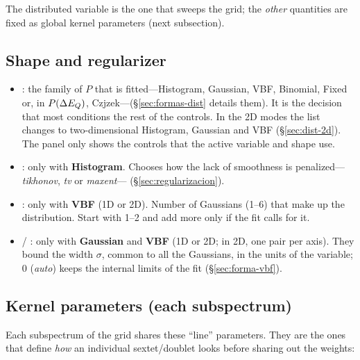 The distributed variable is the one that sweeps the grid; the \emph{other}
quantities are fixed as global kernel parameters (next subsection).

\subsection{Shape and regularizer}

\begin{itemize}[nosep]
  \item {}: the family of $P$ that is fitted---Histogram, Gaussian, VBF,
        Binomial, Fixed or, in $P(\Delta E_{Q})$, Czjzek---(\S\ref{sec:formas-dist} details them). It is the
        decision that most conditions the rest of the controls. In the 2D modes
        the list changes to two-dimensional Histogram, Gaussian and VBF
        (\S\ref{sec:dist-2d}). The panel only shows the controls that the
        active variable and shape use.
  \item {}: only with \textbf{Histogram}. Chooses how the lack of
        smoothness is penalized---\emph{tikhonov}, \emph{tv} or \emph{maxent}---
        (\S\ref{sec:regularizacion}).
  \item {}: only with \textbf{VBF} (1D or 2D). Number of Gaussians (1--6)
        that make up the distribution. Start with 1--2 and add more only if the fit
        calls for it.
  \item {} / : only with \textbf{Gaussian} and
        \textbf{VBF} (1D or 2D; in 2D, one pair per axis). They bound the width
        $\sigma$, common to all the Gaussians, in the units of the variable; $0$
        (\emph{auto}) keeps the internal limits of the fit
        (\S\ref{sec:forma-vbf}).
\end{itemize}

\subsection{Kernel parameters (each subspectrum)}
\label{sec:panel-kernel}

Each subspectrum of the grid shares these ``line'' parameters. They are the ones
that define \emph{how} an individual sextet/doublet looks before sharing out the
weights:

